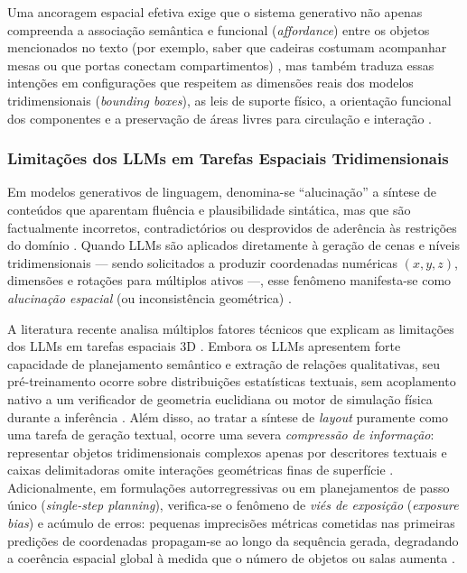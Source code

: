 Uma ancoragem espacial efetiva exige que o sistema generativo não apenas compreenda a associação semântica e funcional (\textit{affordance}) entre os objetos mencionados no texto (por exemplo, saber que cadeiras costumam acompanhar mesas ou que portas conectam compartimentos) \cite{Gallotta_2024, chen2025narrative}, mas também traduza essas intenções em configurações que respeitem as dimensões reais dos modelos tridimensionais (\textit{bounding boxes}), as leis de suporte físico, a orientação funcional dos componentes e a preservação de áreas livres para circulação e interação \cite{sun2024roomplanner, xu2025constraint, ocal2024sceneteller}.

\subsubsection{Limitações dos LLMs em Tarefas Espaciais Tridimensionais}
\label{sec:limitacoes_espaciais_llms}

Em modelos generativos de linguagem, denomina-se ``alucinação'' a síntese de conteúdos que aparentam fluência e plausibilidade sintática, mas que são factualmente incorretos, contradictórios ou desprovidos de aderência às restrições do domínio \cite{Gallotta_2024, xu2025constraint, bandeali2026generative}. Quando LLMs são aplicados diretamente à geração de cenas e níveis tridimensionais --- sendo solicitados a produzir coordenadas numéricas $(x, y, z)$, dimensões e rotações para múltiplos ativos ---, esse fenômeno manifesta-se como \textit{alucinação espacial} (ou inconsistência geométrica) \cite{Gallotta_2024, sun2024roomplanner, yang2026codeasroomgenerating3drooms, feng2026repurposing3dgenerativemodel}.

A literatura recente analisa múltiplos fatores técnicos que explicam as limitações dos LLMs em tarefas espaciais 3D \cite{Gallotta_2024, hu2024scenecraft, sun2024roomplanner, feng2026repurposing3dgenerativemodel, yang2026codeasroomgenerating3drooms}. Embora os LLMs apresentem forte capacidade de planejamento semântico e extração de relações qualitativas, seu pré-treinamento ocorre sobre distribuições estatísticas textuais, sem acoplamento nativo a um verificador de geometria euclidiana ou motor de simulação física durante a inferência \cite{Gallotta_2024, sun2024roomplanner, feng2026repurposing3dgenerativemodel}. Além disso, ao tratar a síntese de \textit{layout} puramente como uma tarefa de geração textual, ocorre uma severa \textit{compressão de informação}: representar objetos tridimensionais complexos apenas por descritores textuais e caixas delimitadoras omite interações geométricas finas de superfície \cite{feng2026repurposing3dgenerativemodel}. Adicionalmente, em formulações autorregressivas ou em planejamentos de passo único (\textit{single-step planning}), verifica-se o fenômeno de \textit{viés de exposição} (\textit{exposure bias}) e acúmulo de erros: pequenas imprecisões métricas cometidas nas primeiras predições de coordenadas propagam-se ao longo da sequência gerada, degradando a coerência espacial global à medida que o número de objetos ou salas aumenta \cite{ocal2024sceneteller, sun2024roomplanner, feng2026repurposing3dgenerativemodel, yang2026codeasroomgenerating3drooms}.

